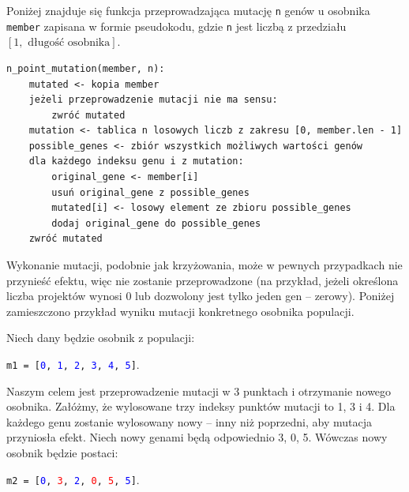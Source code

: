 \documentclass[12pt,a4paper]{article}
\theoremstyle{definition}
\begin{document}
\noindent
Poniżej znajduje się funkcja przeprowadzająca mutację \texttt{n} genów u osobnika \texttt{member} zapisana w formie pseudokodu, gdzie \texttt{n} jest liczbą z przedziału $[1, \text{ długość osobnika}]$.\\

\begin{tcolorbox}[title=Krzyżowanie dwóch osobników]
\begin{verbatim}
n_point_mutation(member, n):
    mutated <- kopia member
    jeżeli przeprowadzenie mutacji nie ma sensu:
        zwróć mutated
    mutation <- tablica n losowych liczb z zakresu [0, member.len - 1]
    possible_genes <- zbiór wszystkich możliwych wartości genów
    dla każdego indeksu genu i z mutation:
        original_gene <- member[i]
        usuń original_gene z possible_genes
        mutated[i] <- losowy element ze zbioru possible_genes
        dodaj original_gene do possible_genes
    zwróć mutated
\end{verbatim}
\end{tcolorbox}

\vspace{0.5em}
\noindent
Wykonanie mutacji, podobnie jak krzyżowania, może w pewnych przypadkach nie przynieść efektu, więc nie zostanie przeprowadzone (na przykład, jeżeli określona liczba projektów wynosi 0 lub dozwolony jest tylko jeden gen -- zerowy). Poniżej zamieszczono przykład wyniku mutacji konkretnego osobnika populacji.\\

\begin{tcolorbox}[title=Przykład --- operacja mutacji]
Niech dany będzie osobnik z populacji:
\begin{center}
	\texttt{m1 = [\textcolor{blue}{0}, \textcolor{blue}{1}, \textcolor{blue}{2}, \textcolor{blue}{3}, \textcolor{blue}{4}, \textcolor{blue}{5}]}.
\end{center}
Naszym celem jest przeprowadzenie mutacji w 3 punktach i otrzymanie nowego osobnika. Załóżmy, że wylosowane trzy indeksy punktów mutacji to 1, 3 i 4. Dla każdego genu zostanie wylosowany nowy -- inny niż poprzedni, aby mutacja przyniosła efekt. Niech nowy genami będą odpowiednio 3, 0, 5. Wówczas nowy osobnik będzie postaci:
\begin{center}
	\texttt{m2 = [\textcolor{blue}{0}, \textcolor{red}{3}, \textcolor{blue}{2}, \textcolor{red}{0}, \textcolor{red}{5}, \textcolor{blue}{5}]}.
\end{center}
\end{tcolorbox}
\end{document}
